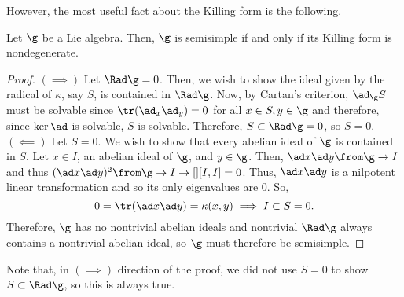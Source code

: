 \documentclass[11pt,leqno,oneside]{amsart}
\numberwithin{thm}{section}
\begin{document}
However, the most useful fact about the Killing form is the following.
\begin{thm}\label{cartan-semisimplicity-criterion}
  Let \(\g\) be a Lie algebra. Then, \(\g\) is semisimple if and only
  if its Killing form is nondegenerate. 
\end{thm}
\begin{proof}
  \((\implies)\) Let \(\Rad \g = 0\). Then, we wish to show the ideal
  given by the radical of \(\kappa\), say \(S\), is contained in
  \(\Rad \g\). Now, by Cartan's criterion, \(\ad_\g S\) must be
  solvable since \(\tr(\ad_x \ad_y) = 0\) for all \(x \in S, y \in
  \g\) and therefore, since \(\ker \ad\) is solvable, \(S\) is
  solvable. Therefore, \(S \subset \Rad \g = 0\), so \(S = 0\). \\

  \((\impliedby)\) Let \(S = 0\). We wish to show that every abelian
  ideal of \(\g\) is contained in \(S\). Let \(x \in I\), an abelian
  ideal of \(\g\), and \(y \in \g\). Then, \(\ad x \ad y \from \g \to
  I\) and thus \((\ad 
  x \ad y)^2 \from \g \to I \to[] [I,I] = 0\). Thus, \(\ad x \ad y\) is
  a nilpotent linear transformation and so its only eigenvalues are
  0. So, \[
    0 = \tr(\ad x \ad y) = \kappa(x,y) \implies I \subset S = 0.
  \]
  Therefore, \(\g\) has no nontrivial abelian ideals and nontrivial
  \(\Rad \g\) 
  always contains a nontrivial abelian ideal, so \(\g\) must
  therefore be semisimple.
\end{proof}
\begin{rmk}
  Note that, in \((\implies)\) direction of the proof, we did not use
  \(S = 0\) to show \(S \subset \Rad \g\), so this is always true.
\end{rmk}
\end{document}
